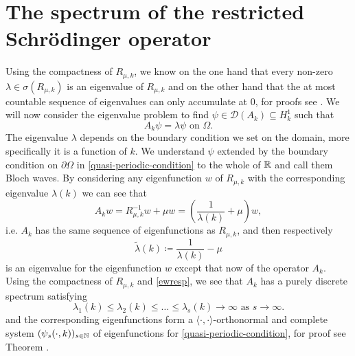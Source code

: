 \section{The spectrum of the restricted Schrödinger operator} \label{sec:4.3}
Using the compactness of $R_{\mu, k}$, we know on the one hand that every non-zero $\lambda \in \sigma(R_{\mu, k})$ is an eigenvalue of $R_{\mu, k}$ and on the other hand that the at most countable sequence of eigenvalues can only accumulate at $0$, for proofs see \cite[p. 271]{werner2006funkana}. We will now consider the eigenvalue problem to find $\psi \in \mathcal{D}(A_{k}) \subseteq H_{k}^{1}$ such that
	\begin{equation}
		A_{k} \psi = \lambda \psi \text{ on } \Omega. \label{eigv-problem}
	\end{equation}
The eigenvalue $\lambda$ depends on the boundary condition we set on the domain, more specifically it is a function of $k$. We understand $\psi$ extended by the boundary condition on $\partial \Omega$ in \eqref{quasi-periodic-condition} to the whole of $\mathbb{R}$ and call them Bloch waves. By considering any eigenfunction $w$ of $R_{\mu, k}$ with the corresponding eigenvalue $\lambda(k)$ we can see that
	\[ A_{k} w = R_{\mu, k}^{-1} w + \mu w = \left(\frac{1}{\lambda(k)} + \mu\right) w, \]
	i.e. $A_{k}$ has the same sequence of eigenfunctions as $R_{\mu, k}$, and then respectively
	\begin{equation}
		\tilde{\lambda}(k) \coloneqq \frac{1}{\lambda(k)} - \mu \label{ewresp}
	\end{equation} 
is an eigenvalue for the eigenfunction $w$ except that now of the operator $A_{k}$. Using the compactness of $R_{\mu, k}$ and \eqref{ewresp}, we see that $A_{k}$ has a purely discrete spectrum satisfying
	\begin{equation}
		\lambda_{1}(k) \leq \lambda_{2}(k) \leq \dotsc \leq \lambda_{s}(k) \rightarrow \infty \text{ as } s \rightarrow \infty. \label{comment-after}
	\end{equation} 
and the corresponding eigenfunctions form a $\langle \cdot , \cdot \rangle$-orthonormal and complete system $(\psi_{s}(\cdot, k))_{s \in \mathbb{N}}$ of eigenfunctions for \eqref{quasi-periodic-condition}, for proof see Theorem \cite[p. 643 - 645]{evans1998partial}.
~\\

